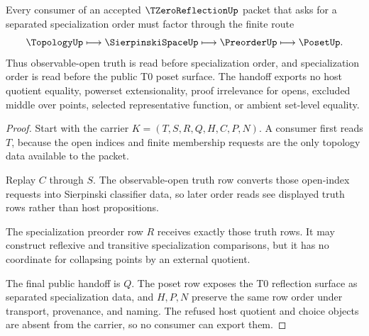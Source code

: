 \begin{theorem}
\label{thm:tzero-reflection-specialization-poset-handoff}
Every consumer of an accepted $\TZeroReflectionUp$ packet that asks for a separated specialization order must factor through the finite route
$$
\TopologyUp \longmapsto \SierpinskiSpaceUp \longmapsto \PreorderUp \longmapsto \PosetUp .
$$
Thus observable-open truth is read before specialization order, and specialization order is read before the public T0 poset surface. The handoff exports no host quotient equality, powerset extensionality, proof irrelevance for opens, excluded middle over points, selected representative function, or ambient set-level equality.
\end{theorem}
\begin{proof}
Start with the carrier $K=(T,S,R,Q,H,C,P,N)$. A consumer first reads $T$, because the open indices and finite membership requests are the only topology data available to the packet.

Replay $C$ through $S$. The observable-open truth row converts those open-index requests into Sierpinski classifier data, so later order reads see displayed truth rows rather than host propositions.

The specialization preorder row $R$ receives exactly those truth rows. It may construct reflexive and transitive specialization comparisons, but it has no coordinate for collapsing points by an external quotient.

The final public handoff is $Q$. The poset row exposes the T0 reflection surface as separated specialization data, and $H,P,N$ preserve the same row order under transport, provenance, and naming. The refused host quotient and choice objects are absent from the carrier, so no consumer can export them.
\end{proof}


\begin{closurestatus}{\TZeroReflectionUp}
  \theoryclosure{\seedClosure}
  \formalstatus{\unformalizedV}
\end{closurestatus}
